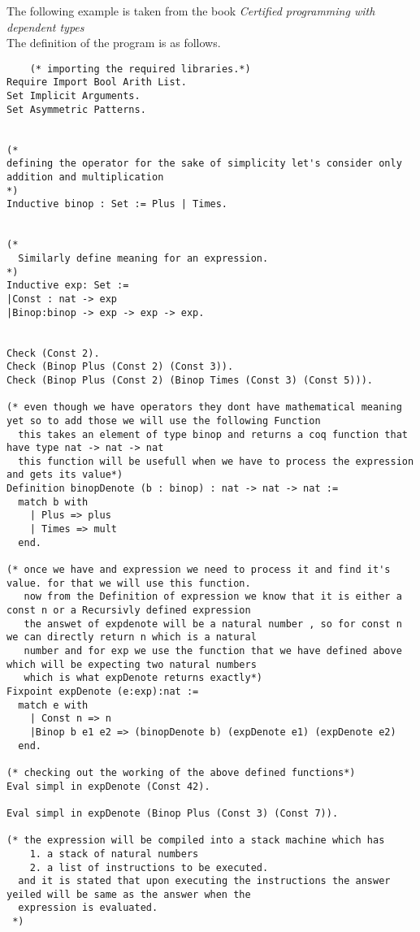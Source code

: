     The following example is taken from the book \textit{Certified programming with dependent types}\cite{cpdt}\\
The definition of the program is as follows.
\begin{verbatim}
    (* importing the required libraries.*)
Require Import Bool Arith List.
Set Implicit Arguments.
Set Asymmetric Patterns.


(*
defining the operator for the sake of simplicity let's consider only addition and multiplication
*)
Inductive binop : Set := Plus | Times.


(*
  Similarly define meaning for an expression.
*)
Inductive exp: Set :=
|Const : nat -> exp
|Binop:binop -> exp -> exp -> exp.


Check (Const 2).
Check (Binop Plus (Const 2) (Const 3)).
Check (Binop Plus (Const 2) (Binop Times (Const 3) (Const 5))).

(* even though we have operators they dont have mathematical meaning yet so to add those we will use the following Function
  this takes an element of type binop and returns a coq function that have type nat -> nat -> nat
  this function will be usefull when we have to process the expression and gets its value*)
Definition binopDenote (b : binop) : nat -> nat -> nat :=
  match b with
    | Plus => plus
    | Times => mult
  end.

(* once we have and expression we need to process it and find it's value. for that we will use this function. 
   now from the Definition of expression we know that it is either a const n or a Recursivly defined expression
   the answet of expdenote will be a natural number , so for const n we can directly return n which is a natural 
   number and for exp we use the function that we have defined above which will be expecting two natural numbers 
   which is what expDenote returns exactly*)
Fixpoint expDenote (e:exp):nat :=
  match e with
    | Const n => n
    |Binop b e1 e2 => (binopDenote b) (expDenote e1) (expDenote e2)
  end.

(* checking out the working of the above defined functions*)
Eval simpl in expDenote (Const 42).

Eval simpl in expDenote (Binop Plus (Const 3) (Const 7)).

(* the expression will be compiled into a stack machine which has
    1. a stack of natural numbers 
    2. a list of instructions to be executed.
  and it is stated that upon executing the instructions the answer yeiled will be same as the answer when the 
  expression is evaluated.
 *)


\end{verbatim}
